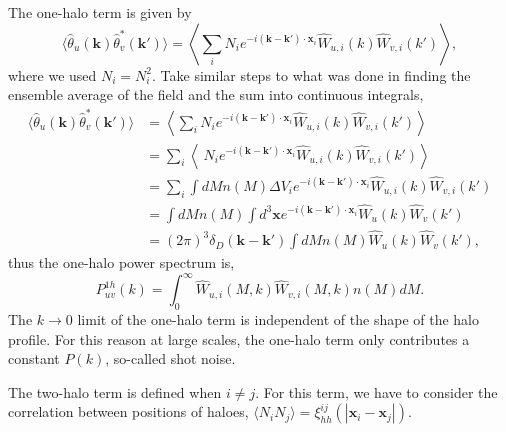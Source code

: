 The one-halo term is given by
\begin{equation}
    \langle\hat{\theta}_u(\bm{k})\hat{\theta}^*_v(\bm{k}')\rangle = \left\langle\sum_i N_i e^{-i (\bm{k} - \bm{k}') \cdot \bm{x}_i} \hat{W}_{u, i}(k) \hat{W}_{v, i}(k')\right\rangle,
    \label{eq:onehalo}
\end{equation}
where we used $N_i = N_i^2$. Take similar steps to what was done in finding the ensemble average of the field and the sum into continuous integrals,
\begin{align}
    \langle\hat{\theta}_u(\bm{k})\hat{\theta}^*_v(\bm{k}')\rangle &= \left\langle\sum_i N_i e^{-i (\bm{k} - \bm{k}') \cdot \bm{x}_i} \hat{W}_{u, i}(k) \hat{W}_{v, i}(k')\right\rangle \\
    &= \sum_i\left\langle\ N_i e^{-i (\bm{k} - \bm{k}') \cdot \bm{x}_i} \hat{W}_{u, i}(k) \hat{W}_{v, i}(k')\right\rangle\\
    &= \sum_i \int dM n(M) \Delta V_i e^{-i (\bm{k} - \bm{k}') \cdot \bm{x}_i} \hat{W}_{u, i}(k) \hat{W}_{v, i}(k')\\
    &= \int dM n(M) \int d^3\bm{x} e^{-i (\bm{k} - \bm{k}') \cdot \bm{x}_i} \hat{W}_{u}(k) \hat{W}_{v}(k')\\
    &= (2\pi)^3\delta_D(\bm{k} - \bm{k}') \int dM n(M) \hat{W}_{u}(k) \hat{W}_{v}(k'),
\end{align}
thus the one-halo power spectrum is,
\begin{equation}
    \label{eq:onehalop}
    P^{1h}_{uv}(k) = \int_0^\infty \hat{W}_{u, i}(M, k) \hat{W}_{v, i}(M, k) n(M) dM.
\end{equation}
The $k\to0$ limit of the one-halo term is independent of the shape of the halo profile. For this reason at large scales, the one-halo term only contributes a constant $P(k)$, so-called shot noise.

The two-halo term is defined when $i\neq j$. For this term, we have to consider the correlation between positions of haloes, $\langle N_iN_j\rangle = \xi^{ij}_{hh}(|\bm{x}_i - \bm{x}_j|)$.

